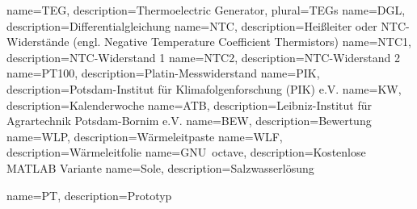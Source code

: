 {
  name=TEG,
  description={Thermoelectric Generator},
  plural=TEGs
}
%
{
  name=DGL,
  description={Differentialgleichung}
}
%
{
  name=NTC,
  description={Heißleiter oder NTC-Widerstände (engl. Negative Temperature Coefficient Thermistors) }
}
%
{
  name=NTC1,
  description={NTC-Widerstand 1}
}
%
%
{
  name=NTC2,
  description={NTC-Widerstand 2}
}
%
{
  name=PT100,
  description={Platin-Messwiderstand}
}
%
{
  name=PIK,
  description={Potsdam-Institut für Klimafolgenforschung (PIK) e.V.}
}
%
{
  name=KW,
  description={Kalenderwoche}
}
%
{
  name=ATB,
  description={Leibniz-Institut für Agrartechnik Potsdam-Bornim e.V.}
}
%
{
  name=BEW,
  description={Bewertung}
}
%
{
  name=WLP,
  description={Wärmeleitpaste}
}
%
%
{
  name=WLF,
  description={Wärmeleitfolie}
}
%
{
  name={GNU\ octave},
  description={Kostenlose MATLAB Variante}
}
%
{
  name=Sole,
  description={Salzwasserlösung}
}

{
  name=PT,
  description={Prototyp}
}